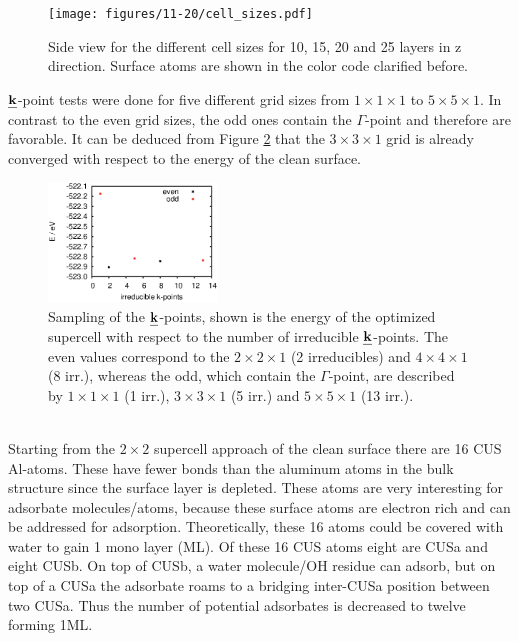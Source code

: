 \documentclass[11pt,DIV=13,BCOR=5mm,a4paper,headinclude]{scrbook}
\def\mathbi#1{\textbf{\em #1}}
\renewcommand{\vec}[1]{\mathbi{#1}}
\begin{document}
\begin{figure}[!h]
    \centering
    \texttt{[image: figures/11-20/cell\_sizes.pdf]}
             \caption{Side view for the different cell sizes for 10, 15, 20 and 25 layers in z direction.
Surface atoms are shown in the color code clarified before.}
            \label{abb:cell_sizes}
\end{figure}
$\vec{k}$-point tests were done for five different grid sizes from $1\times 1\times 1$ to $5\times 5\times 1$.
In contrast to the even grid sizes, the odd ones contain the $\Gamma$-point and therefore are favorable.
It can be deduced from Figure \ref{abb:11-20-kpointsampling} that the $3\times 3\times 1$ grid is already converged with respect to the energy of the clean surface.
\begin{figure}[!h]
\centering
 \includegraphics[width=0.4\textwidth]{figures/11-20/irreducibles-E.eps}
   \caption{Sampling of the $\vec{k}$-points, shown is the energy of the optimized supercell with respect to the number of irreducible $\vec{k}$-points.
The even values correspond to the $2\times 2 \times 1$ (2 irreducibles) and $4\times 4\times 1$ (8 irr.), whereas the odd, which contain the $\Gamma$-point, are described by $1\times 1\times 1$ (1 irr.), $3\times 3\times 1$ (5 irr.) and $5\times 5\times 1$ (13 irr.).}
            \label{abb:11-20-kpointsampling}
\end{figure}
\\
Starting from the $2\times 2$ supercell approach of the clean surface there are 16 CUS Al-atoms.
These have fewer bonds than the aluminum atoms in the bulk structure since the surface layer is  depleted.
These atoms are very interesting for adsorbate molecules/atoms, because these surface atoms are electron rich and can be addressed for adsorption.
Theoretically, these 16 atoms could be covered with water to gain 1 mono layer (ML).
Of these 16 CUS atoms eight are CUSa and eight CUSb.
On top of CUSb, a water molecule/OH residue can adsorb, but on top of a CUSa the adsorbate roams to a bridging inter-CUSa position between two CUSa.
Thus the number of potential adsorbates is decreased to twelve forming 1ML.
\end{document}
